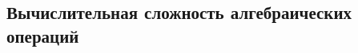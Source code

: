 \documentclass[_00_dissertation.tex]{subfiles}
\begin{document}
\subsection{Вычислительная сложность алгебраических операций}





	

\end{document}
